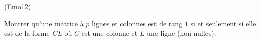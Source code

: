 \begin{tiny}(Emo12)\end{tiny} Montrer qu'une matrice à $p$ lignes et colonnes est de rang $1$ si et seulement si elle est de la forme $CL$ où $C$ est une colonne et $L$ une ligne (non nulles).
 